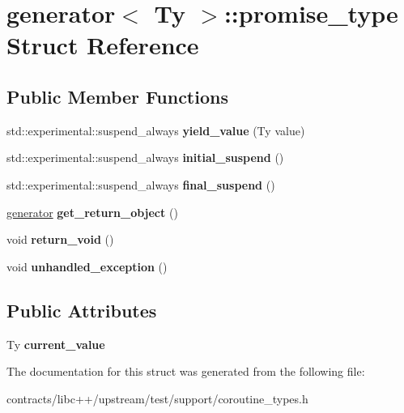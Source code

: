 \hypertarget{structgenerator_1_1promise__type}{}\section{generator$<$ Ty $>$\+:\+:promise\+\_\+type Struct Reference}
\label{structgenerator_1_1promise__type}
\subsection*{Public Member Functions}
\begin{DoxyCompactItemize}
\item 
\mbox{\label{structgenerator_1_1promise__type_a9f59bd972c2a63f0a1eab3e6f8075e3a}} 
std\+::experimental\+::suspend\+\_\+always {\bfseries yield\+\_\+value} (Ty value)
\item 
\mbox{\label{structgenerator_1_1promise__type_a57aaa8dd7375982764e7252b40e646d0}} 
std\+::experimental\+::suspend\+\_\+always {\bfseries initial\+\_\+suspend} ()
\item 
\mbox{\label{structgenerator_1_1promise__type_a5db8df9badff476f01fc912700ddfb4f}} 
std\+::experimental\+::suspend\+\_\+always {\bfseries final\+\_\+suspend} ()
\item 
\mbox{\label{structgenerator_1_1promise__type_acab8c2be8317ab43389aff97e145556d}} 
\mbox{\hyperlink{structgenerator}{generator}} {\bfseries get\+\_\+return\+\_\+object} ()
\item 
\mbox{\label{structgenerator_1_1promise__type_a85a9b9bd4f48d010b77bf526703ee8db}} 
void {\bfseries return\+\_\+void} ()
\item 
\mbox{\label{structgenerator_1_1promise__type_ad998c1960bee1ce2e088fd46ec2b589c}} 
void {\bfseries unhandled\+\_\+exception} ()
\end{DoxyCompactItemize}
\subsection*{Public Attributes}
\begin{DoxyCompactItemize}
\item 
\mbox{\label{structgenerator_1_1promise__type_afb57583593e7ecb5e57ce8a055c07205}} 
Ty {\bfseries current\+\_\+value}
\end{DoxyCompactItemize}


The documentation for this struct was generated from the following file\+:\begin{DoxyCompactItemize}
\item 
contracts/libc++/upstream/test/support/coroutine\+\_\+types.\+h\end{DoxyCompactItemize}
